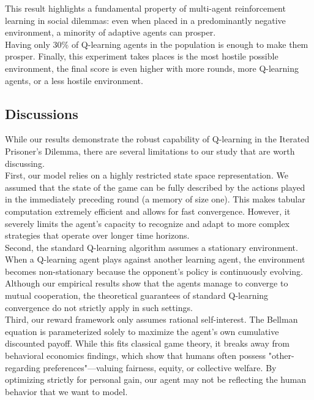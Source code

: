 \documentclass[11pt, a4paper]{article}
\begin{document}
This result highlights a fundamental property of multi-agent reinforcement learning in social dilemmas: even when placed in a predominantly negative environment, a minority of adaptive agents can prosper.\\

Having only 30\% of Q-learning agents in the population is enough to make them prosper. Finally, this experiment takes places is the most hostile possible environment, the final score is even higher with more rounds, more Q-learning agents, or a less hostile environment. \\
\newpage
\subsection{Discussions}
\label{sec:discussions}

While our results demonstrate the robust capability of Q-learning in the Iterated Prisoner's Dilemma, there are several limitations to our study that are worth discussing. \\

First, our model relies on a highly restricted state space representation. We assumed that the state of the game can be fully described by the actions played in the immediately preceding round (a memory of size one). This makes tabular computation extremely efficient and allows for fast convergence. However, it severely limits the agent's capacity to recognize and adapt to more complex strategies that operate over longer time horizons.\\ 

Second, the standard Q-learning algorithm assumes a stationary environment. When a Q-learning agent plays against another learning agent, the environment becomes non-stationary because the opponent's policy is continuously evolving. Although our empirical results show that the agents manage to converge to mutual cooperation, the theoretical guarantees of standard Q-learning convergence do not strictly apply in such settings.\\

Third, our reward framework only assumes rational self-interest. The Bellman equation is parameterized solely to maximize the agent's own cumulative discounted payoff. While this fits classical game theory, it breaks away from behavioral economics findings, which show that humans often possess "other-regarding preferences"---valuing fairness, equity, or collective welfare. By optimizing strictly for personal gain, our agent may not be reflecting the human behavior that we want to model.
\end{document}
